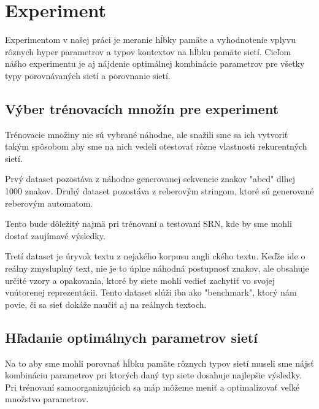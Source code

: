 
\chapter{Experiment}
Experimentom v našej práci je meranie hĺbky pamäte a vyhodnotenie vplyvu rôznych
hyper parametrov a typov kontextov na hĺbku pamäte sietí. 
Cieľom nášho experimentu je aj nájdenie 
optimálnej kombinácie parametrov pre všetky typy porovnávaných sietí a porovnanie sietí.

\section{Výber trénovacích množín pre experiment}
Trénovacie množiny nie sú vybrané náhodne, ale snažili sme sa ich vytvoriť
takým spôsobom aby sme na nich vedeli otestovať rôzne vlastnosti rekurentných sietí.

Prvý dataset pozostáva z náhodne generovanej sekvencie znakov "abcd" dlhej 1000 znakov.
Druhý dataset pozostáva z reberovým stringom, ktoré sú generované reberovým automatom.

Tento bude dôležitý najmä pri trénovaní a testovaní SRN, kde by sme mohli dostať zaujímavé výsledky.

Tretí dataset je úryvok textu z nejakého korpusu angli ckého textu. 
Keďže ide o reálny zmysluplný text, nie je to úplne náhodná postupnosť znakov, ale obsahuje určité vzory a opakovania, ktoré by siete mohli vedieť zachytiť
vo svojej vnútorenej reprezentácii.
Tento dataset slúži iba ako "benchmark", ktorý nám povie, či sa sieť dokáže naučiť aj na reálnych textoch.

\section{Hľadanie optimálnych parametrov sietí}
Na to aby sme mohli porovnať hĺbku pamäte rôznych typov sietí museli sme nájsť kombináciu parametrov
pri ktorých daný typ siete dosahuje najlepšie výsledky. 
Pri trénovaní samoorganizujúcich sa máp môžeme meniť a optimalizovať veľké množstvo parametrov. 

